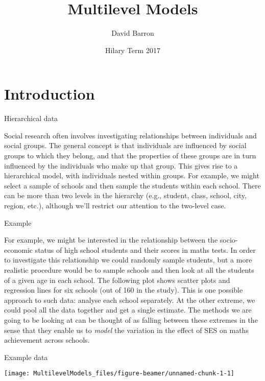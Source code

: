 \documentclass[10pt,ignorenonframetext,]{beamer}
\title{Multilevel Models}
\author{David Barron}
\date{Hilary Term 2017}
\begin{document}
\frame{\titlepage}

\section{Introduction}\label{introduction}

\begin{frame}{Hierarchical data}

Social research often involves investigating relationships between
individuals and social groups. The general concept is that individuals
are influenced by social groups to which they belong, and that the
properties of these groups are in turn influenced by the individuals who
make up that group. This gives rise to a hierarchical model, with
individuals nested within groups. For example, we might select a sample
of schools and then sample the students within each school. There can be
more than two levels in the hierarchy (e.g., student, class, school,
city, region, etc.), although we'll restrict our attention to the
two-level case.

\end{frame}

\begin{frame}{Example}

For example, we might be interested in the relationship between the
socio-economic status of high school students and their scores in maths
tests. In order to investigate this relationship we could randomly
sample students, but a more realistic procedure would be to sample
schools and then look at all the students of a given age in each school.
The following plot shows scatter plots and regression lines for six
schools (out of 160 in the study). This is one possible approach to such
data: analyse each school separately. At the other extreme, we could
pool all the data together and get a single estimate. The methods we are
going to be looking at can be thought of as falling between these
extremes in the sense that they enable us to \emph{model} the variation
in the effect of SES on maths achievement across schools.

\end{frame}

\begin{frame}{Example data}

\begin{center}\texttt{[image: MultilevelModels\_files/figure-beamer/unnamed-chunk-1-1]} \end{center}

\end{frame}
\end{document}
